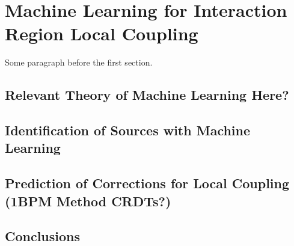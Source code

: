 
\chapter{Machine Learning for Interaction Region Local Coupling} %

\label{Chapter4} %




Some paragraph before the first section.


\section{Relevant Theory of Machine Learning Here?}


\section{Identification of Sources with Machine Learning}


\section{Prediction of Corrections for Local Coupling (1BPM Method CRDTs?)}


\section{Conclusions}

